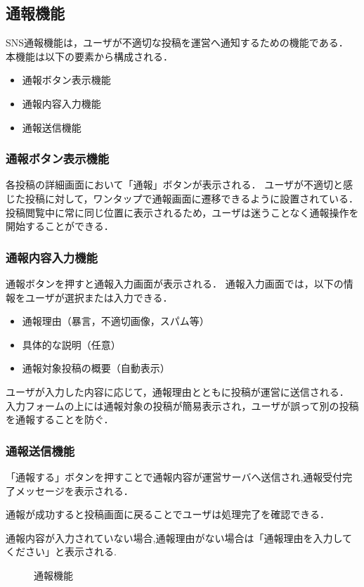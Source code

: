 \subsection{通報機能}
SNS通報機能は，ユーザが不適切な投稿を運営へ通知するための機能である．
本機能は以下の要素から構成される．

\begin{itemize}
  \item 通報ボタン表示機能
  \item 通報内容入力機能
  \item 通報送信機能
\end{itemize}

\subsubsection{通報ボタン表示機能}
各投稿の詳細画面において「通報」ボタンが表示される．
ユーザが不適切と感じた投稿に対して，ワンタップで通報画面に遷移できるように設置されている．
投稿閲覧中に常に同じ位置に表示されるため，ユーザは迷うことなく通報操作を開始することができる．


\subsubsection{通報内容入力機能}
通報ボタンを押すと通報入力画面が表示される．
通報入力画面では，以下の情報をユーザが選択または入力できる．

\begin{itemize}
  \item 通報理由（暴言，不適切画像，スパム等）
  \item 具体的な説明（任意）
  \item 通報対象投稿の概要（自動表示）
\end{itemize}

ユーザが入力した内容に応じて，通報理由とともに投稿が運営に送信される．
入力フォームの上には通報対象の投稿が簡易表示され，ユーザが誤って別の投稿を通報することを防ぐ．


\subsubsection{通報送信機能}
「通報する」ボタンを押すことで通報内容が運営サーバへ送信され,通報受付完了メッセージを表示される．

通報が成功すると投稿画面に戻ることでユーザは処理完了を確認できる．

通報内容が入力されていない場合,通報理由がない場合は「通報理由を入力してください」と表示される.



\begin{figure}[H]
        \centering
        
        \caption{通報機能}
        \label{fig:report3}
\end{figure}